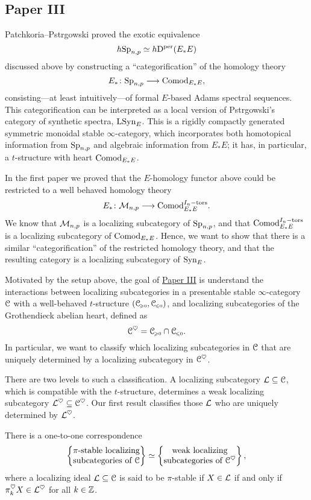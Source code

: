 \subsection{Paper III}

Patchkoria--Pstr\a{}gowski proved the exotic equivalence 
\[h\mathrm{Sp}_{n,p} \simeq h\mathrm{D}^{\mathrm{per}}(E_*E)\] 
discussed above by constructing a ``categorification'' of the homology theory 
\[E_* \colon \mathrm{Sp}_{n,p} \longrightarrow \mathrm{Comod}_{E_*E},\]
consisting---at least intuitively---of formal $E$-based Adams spectral sequences. This categorification can be interpreted as a local version of Pstr\a{}gowski's category of synthetic spectra, $\mathrm{LSyn}_{E}$. This is a rigidly compactly generated symmetric monoidal stable $\infty$-category, which incorporates both homotopical information from $\mathrm{Sp}_{n,p}$ and algebraic information from $E_*E$; it has, in particular, a $t$-structure with heart $\mathrm{Comod}_{E_*E}$. 

In the first paper we proved that the $E$-homology functor above could be restricted to a well behaved homology theory 
\[E_* \colon \mathcal{M}_{n,p} \longrightarrow \mathrm{Comod}_{E_*E}^{I_n-\mathrm{tors}}.\]
We know that $\mathcal{M}_{n,p}$ is a localizing subcategory of $\mathrm{Sp}_{n,p}$, and that $\mathrm{Comod}_{E_*E}^{I_n-\mathrm{tors}}$ is a localizing subcategory of $\mathrm{Comod}_{E_*E}$. Hence, we want to show that there is a similar ``categorification'' of the restricted homology theory, and that the resulting category is a localizing subcategory of $\mathrm{Syn}_{E}$.  

Motivated by the setup above, the goal of \hyperref[ch3]{Paper III} is understand the interactions between localizing subcategories in a presentable stable $\infty$-category $\EuScript{C}$ with a well-behaved $t$-structure $(\EuScript{C}_{\hspace{-1pt}\scriptscriptstyle\geqslant 0}, \EuScript{C}_{\hspace{-1pt}\scriptscriptstyle\leqslant 0})$, and localizing subcategories of the Grothendieck abelian heart, defined as 
\[\EuScript{C}^\heartsuit = \EuScript{C}_{\hspace{-1pt}\scriptscriptstyle\geqslant 0}\cap \EuScript{C}_{\hspace{-1pt}\scriptscriptstyle\leqslant 0}.\] 
In particular, we want to classify which localizing subcategories in $\EuScript{C}$ that are uniquely determined by a localizing subcategory in $\EuScript{C}^\heartsuit$. 

There are two levels to such a classification. A localizing subcategory $\mathcal{L}\subseteq \EuScript{C}$, which is compatible with the $t$-structure, determines a weak localizing subcategory $\mathcal{L}^\heartsuit \subseteq \EuScript{C}^\heartsuit$. Our first result classifies those $\mathcal{L}$ who are uniquely determined by $\mathcal{L}^\heartsuit$. 

\begin{theorem}
    There is a one-to-one correspondence
    \[\left\{ \begin{matrix} \pi\text{-stable localizing}\\ \text{subcategories of }\EuScript{C} \end{matrix} \right\} \simeq \left\{ \begin{matrix} \text{weak localizing}\\ \text{subcategories of }\EuScript{C}^\heartsuit \end{matrix} \right\},\]
    where a localizing ideal $\mathcal{L}\subseteq \EuScript{C}$ is said to be $\pi$-stable if $X\in \mathcal{L}$ if and only if $\pi_k^\heartsuit X \in \mathcal{L}^\heartsuit$ for all $k\in \mathbb{Z}$.  
\end{theorem}

